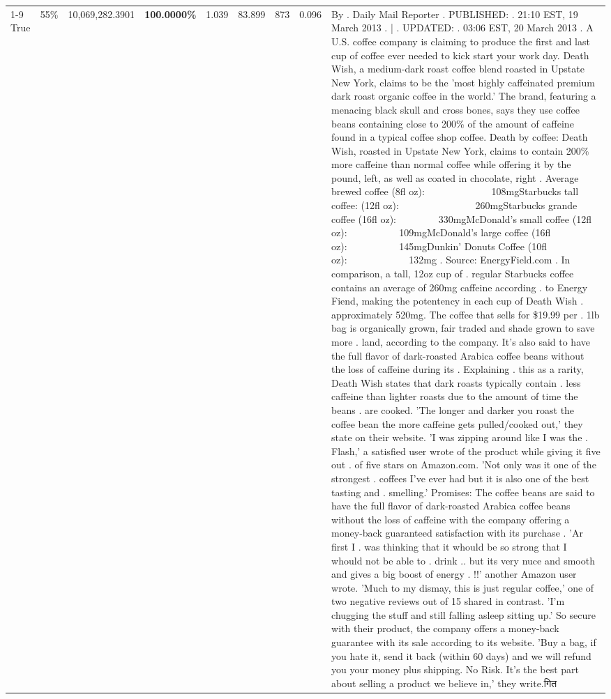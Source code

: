 \begin{table}[H]
{\begin{tabular}{lllrlllll}
\cline{1-9} \cline{2-9}
True & 55\% & 10,069,282.3901 & \bfseries \color{red} 100.0000\% & 1.039 & 83.899 & 873 & 0.096 & By . Daily Mail Reporter . PUBLISHED: . 21:10 EST, 19 March 2013 . | . UPDATED: . 03:06 EST, 20 March 2013 . A U.S. coffee company is claiming to produce the first and last cup of coffee ever needed to kick start your work day. Death Wish, a medium-dark roast coffee blend roasted in Upstate New York, claims to be the 'most highly caffeinated premium dark roast organic coffee in the world.' The brand, featuring a menacing black skull and cross bones, says they use coffee beans containing close to 200\% of the amount of caffeine found in a typical coffee shop coffee. Death by coffee: Death Wish, roasted in Upstate New York, claims to contain 200\% more caffeine than normal coffee while offering it by the pound, left, as well as coated in chocolate, right . Average brewed coffee (8fl oz):              108mgStarbucks tall coffee: (12fl oz):                260mgStarbucks grande coffee (16fl oz):         330mgMcDonald's small coffee (12fl oz):           109mgMcDonald's large coffee (16fl oz):           145mgDunkin' Donuts Coffee (10fl oz):             132mg . Source: EnergyField.com . In comparison, a tall, 12oz cup of . regular Starbucks coffee contains an average of 260mg caffeine according . to Energy Fiend, making the potentency in each cup of Death Wish . approximately 520mg. The coffee that sells for \$19.99 per . 1lb bag is organically grown, fair traded and shade grown to save more . land, according to the company. It's also said to have the full flavor of dark-roasted Arabica coffee beans without the loss of caffeine during its . Explaining . this as a rarity, Death Wish states that dark roasts typically contain . less caffeine than lighter roasts due to the amount of time the beans . are cooked. 'The longer and darker you roast the coffee bean the more caffeine gets pulled/cooked out,' they state on their website. 'I was zipping around like I was the . Flash,' a satisfied user wrote of the product while giving it five out . of five stars on Amazon.com. 'Not only was it one of the strongest . coffees I've ever had but it is also one of the best tasting and . smelling.’ Promises: The coffee beans are said to have the full flavor of dark-roasted Arabica coffee beans without the loss of caffeine with the company offering a money-back guaranteed satisfaction with its purchase . 'Ar first I . was thinking that it whould be so strong that I whould not be able to . drink .. but its very nuce and smooth and gives a big boost of energy . !!' another Amazon user wrote. 'Much to my dismay, this is just regular coffee,' one of two negative reviews out of 15 shared in contrast. 'I'm chugging the stuff and still falling asleep sitting up.' So secure with their product, the company offers a money-back guarantee with its sale according to its website. 'Buy a bag, if you hate it, send it back (within 60 days) and we will refund you your money plus shipping. No Risk. It’s the best part about selling a product we believe in,' they write.गित \\

\end{tabular}}
\end{table}
